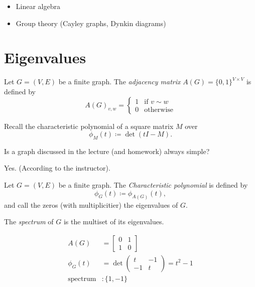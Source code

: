 \begin{itemize}
\item Linear algebra
\item Group theory (Cayley graphs, Dynkin diagrams)
\end{itemize}

\section{Eigenvalues}

\begin{definition}
Let \(G=(V,E)\) be a finite graph.
The \emph{adjacency matrix} \( A(G)=\{0,1\}^{V\times V} \) is defined by
\[ A(G)_{v,w}=\begin{cases} 1 & \text{if } v\sim w \\ 0 & \text{otherwise} \end{cases} \]
\end{definition}

Recall the characteristic polynomial of a square matrix \(M\) over \C
\[ \phi_M(t)\coloneqq \det(tI-M). \]

\begin{question}
Is a graph discussed in the lecture (and homework) always simple?
\end{question}
\begin{answer}
Yes. (According to the instructor).
\end{answer}

\begin{definition}
Let \(G=(V,E)\) be a finite graph.
The \emph{Characteristic polynomial} is defined by
\[ \phi_G(t)\coloneqq \phi_{A(G)}(t), \]
and call the zeros (with multiplicitier) the eigenvalues of \(G\).
\end{definition}

\begin{definition}[Spectrum]
The \emph{spectrum} of \(G\) is the multiset of its eigenvalues.
\end{definition}

\begin{example}[Spectrum]
\begin{align*}
A(G)&=\begin{bmatrix} 0 & 1 \\ 1 & 0 \end{bmatrix}\\
\phi_G(t)&=\det\begin{pmatrix} t & -1 \\ -1 & t \end{pmatrix}=t^2-1\\
\text{spectrum}&: \{1,-1\}
\end{align*}
\end{example}

